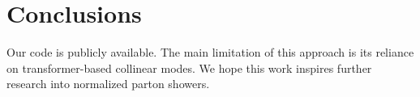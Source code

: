 \section{Conclusions}\label{sec:conclusions}

Our code is publicly available. The main limitation of this approach is
its reliance on transformer-based collinear modes. We hope this work
inspires further research into normalized parton showers.


